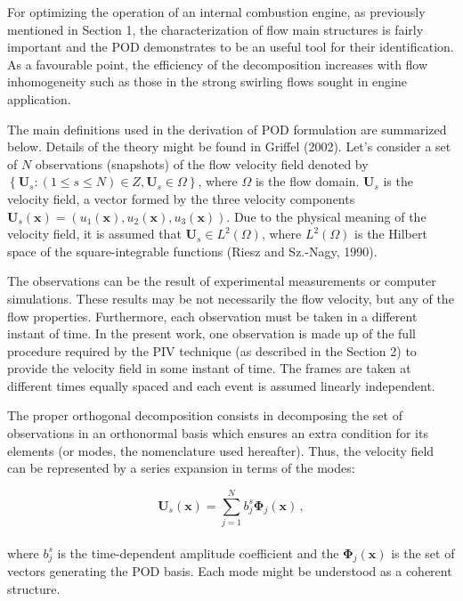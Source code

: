 \documentclass[12pt,a4paper]{article}
\newcommand{\bv}[1]{\mathbf{#1}}
\begin{document}
For optimizing the operation of an internal combustion engine, as previously mentioned in Section 1, the characterization of flow main structures is fairly important and the POD demonstrates to be an useful tool for their identification. As a favourable point, the efficiency of the decomposition increases with flow inhomogeneity such as those in the strong swirling flows sought in engine application. 

The main definitions used in the derivation of POD formulation are summarized below. Details of the theory might be found in Griffel (2002). Let's consider a set of $N$ observations (snapshots) of the flow velocity field denoted by $\left \lbrace \mathbf{U}_{s} : (1 \le s \le N) \in Z, \mathbf{U}_s \in \Omega \right \rbrace$, where $\Omega$ is the flow domain. $\bv{U}_{s}$ is the velocity field, a vector formed by the three velocity components $\bv{U}_{s}(\bv{x})=(u_1 (\bv{x}), u_2 (\bv{x}), u_3(\bv{x}))$. Due to the physical meaning of the velocity field, it is assumed that $\bv{U}_s \in L^2 (\Omega)$, where $L^2(\Omega)$ is the Hilbert space of the square-integrable functions (Riesz and Sz.-Nagy, 1990).

The observations can be the result of experimental measurements or computer simulations. These results may be not necessarily the flow velocity, but any of the flow properties. Furthermore, each observation must be taken in a different instant of time. In the present work, one observation is made up of the full procedure required by the PIV technique (as described in the Section 2) to provide the velocity field in some instant of time. The frames are taken at different times equally spaced and each event is assumed linearly independent.

The proper orthogonal decomposition consists in decomposing the set of observations in an orthonormal basis which ensures an extra condition for its elements (or modes, the nomenclature used hereafter). Thus, the velocity field can be represented by a series expansion in terms of the modes:


\begin{equation}\label{eq: Us}
 \bv{U}_s (\bv{x}) = \sum_{j=1}^{N} b^{s}_{j} \bv{\Phi}_{j}(\bv{x}) \,,
\end{equation}
\\
where $b^{s}_{j}$ is the time-dependent amplitude coefficient and the $\bv{\Phi}_{j}(\bv{x})$ is the set of vectors generating the POD basis.  
Each mode might be understood as a coherent structure.
\end{document}
